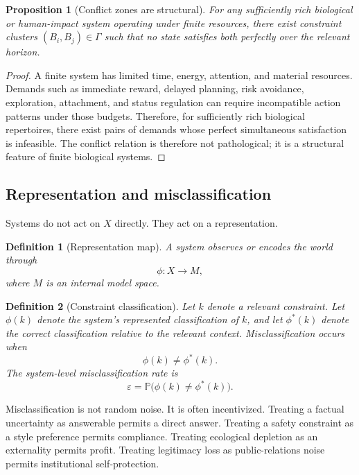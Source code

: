 \documentclass[11pt]{article}
\newtheorem{definition}{Definition}[section]
\newtheorem{proposition}{Proposition}[section]
\newcommand{\Prob}{\mathbb{P}}
\newcommand{\eps}{\varepsilon}
\begin{document}
\begin{proposition}[Conflict zones are structural]
For any sufficiently rich biological or human-impact system operating under finite resources, there exist constraint clusters \((B_i,B_j)\in\Gamma\) such that no state satisfies both perfectly over the relevant horizon.
\end{proposition}

\begin{proof}
A finite system has limited time, energy, attention, and material resources. Demands such as immediate reward, delayed planning, risk avoidance, exploration, attachment, and status regulation can require incompatible action patterns under those budgets. Therefore, for sufficiently rich biological repertoires, there exist pairs of demands whose perfect simultaneous satisfaction is infeasible. The conflict relation is therefore not pathological; it is a structural feature of finite biological systems.
\end{proof}

\subsection{Representation and misclassification}

Systems do not act on \(X\) directly. They act on a representation.

\begin{definition}[Representation map]
A system observes or encodes the world through
\[
\phi:X\to M,
\]
where \(M\) is an internal model space.
\end{definition}

\begin{definition}[Constraint classification]
Let \(k\) denote a relevant constraint. Let \(\phi(k)\) denote the system's represented classification of \(k\), and let \(\phi^\ast(k)\) denote the correct classification relative to the relevant context. Misclassification occurs when
\[
\phi(k)\neq \phi^\ast(k).
\]
The system-level misclassification rate is
\[
\eps = \Prob\big(\phi(k)\neq \phi^\ast(k)\big).
\]
\end{definition}

Misclassification is not random noise. It is often incentivized. Treating a factual uncertainty as answerable permits a direct answer. Treating a safety constraint as a style preference permits compliance. Treating ecological depletion as an externality permits profit. Treating legitimacy loss as public-relations noise permits institutional self-protection.
\end{document}
